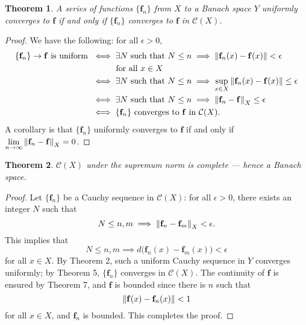 \documentclass[11pt]{article}
\newtheorem{theorem}{Theorem}
\renewcommand{\vec}[1]{\mathbf{#1}}
\begin{document}
\begin{theorem}
	A series of functions $\{ \vec{f}_{n} \}$ from $X$ to a Banach space $Y$ uniformly converges to $\vec{f}$ if and only if $\{ \vec{f}_{n} \}$ converges to $\vec{f}$ in $\mathcal{C}(X)$.
\end{theorem}
\begin{adjustwidth}{1cm}{}
	\begin{proof}
		We have the following: for all $\epsilon > 0$,
		\begin{align*}
			\{ \vec{f}_{n} \} \to \vec{f} \text{ is uniform } &\iff \exists N \text{ such that } N \le n \implies \norm{\vec{f}_{n}(x) - \vec{f}(x)} < \epsilon  \\
			& \, \, \, \, \qquad \text{ for all $x \in X$} \\
			&\iff \exists N \text{ such that } N \le n \implies \sup_{x \in X} \norm{\vec{f}_{n}(x) - \vec{f}(x)} \le \epsilon \\ 
			&\iff \exists N \text{ such that } N \le n \implies \norm{\vec{f}_{n} - \vec{f}}_{X} \le \epsilon \\
			&\iff \{ \vec{f}_{n} \} \text{ converges to $\vec{f}$ in } \mathcal{C}(X).
		\end{align*}
		A corollary is that $\{ \vec{f}_{n} \}$ uniformly converges to $\vec{f}$ if and only if $\lim\limits_{n \to \infty} \norm{\vec{f}_{n} - \vec{f}}_{X} = 0$.
	\end{proof}
\end{adjustwidth}

\begin{theorem}
	$\mathcal{C}(X)$ under the supremum norm is complete --- hence a Banach space.
\end{theorem}
\begin{adjustwidth}{1cm}{}
	\begin{proof}
		Let $\{ \vec{f}_{n} \}$ be a Cauchy sequence in $\mathcal{C}(X)$: for all $\epsilon > 0$, there exists an integer $N$ such that
		\[
			N \le n, m \implies \norm{\vec{f}_{n} - \vec{f}_{m}}_{X} < \epsilon.
		\]
		This implies that
		\[
			N \le n, m \implies d \big( \vec{f}_{n}(x) - \vec{f}_{m}(x) \big) < \epsilon
		\]
		for all $x \in X$. By Theorem 2, such a uniform Cauchy sequence in $Y$ converges uniformly; by Theorem 5, $\{ \vec{f}_{n} \}$ converges in $\mathcal{C}(X)$. The continuity of $\vec{f}$ is ensured by Theorem 7, and $\vec{f}$ is bounded since there is $n$ such that
		\[
			\norm{\vec{f}(x) - \vec{f}_{n}(x)} < 1
		\]
		for all $x \in X$, and $\vec{f}_{n}$ is bounded. This completes the proof.
	\end{proof}
\end{adjustwidth}
\end{document}
